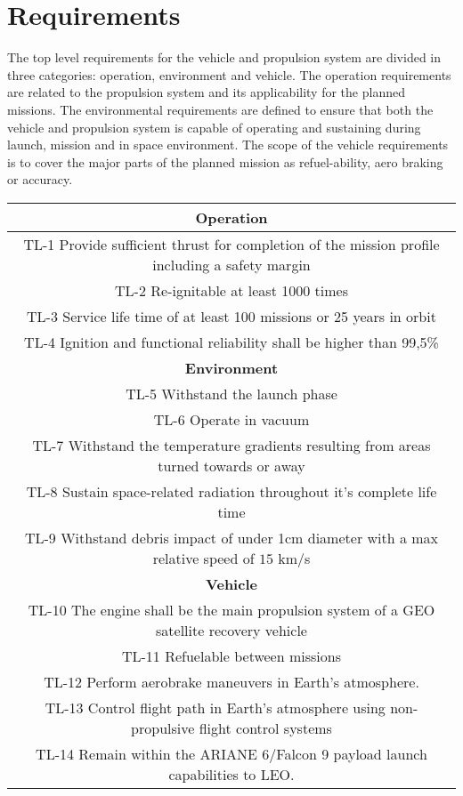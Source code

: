 \chapter{Requirements}
\qquad The top level requirements for the vehicle and propulsion system are divided in three categories: operation, environment and vehicle. The operation requirements are related to the propulsion system and its applicability for the planned missions. The environmental requirements are defined to ensure that both the vehicle and propulsion system is capable of operating and sustaining during launch, mission and in space environment. The scope of the vehicle requirements is to cover the major parts of the planned mission as refuel-ability, aero braking or accuracy. \\
\noindent
\begin{table}
\begin{tabular}{|c|}
	\hline
	\cellcolor{blue!60}\textbf{Operation}\\
	\hline
	\cellcolor{blue!15} TL-1 Provide sufficient thrust for completion of the mission profile including a safety margin\\
	\hline
	\cellcolor{blue!15} TL-2 Re-ignitable at least 1000 times\\
	\hline
	\cellcolor{blue!15} TL-3 Service life time of at least 100 missions or 25 years in orbit\\
	\hline
	\cellcolor{blue!15} TL-4 Ignition and functional reliability shall be higher than 99,5\%\\

	\hline
	\cellcolor{blue!60}\textbf{Environment}\\
	\hline
	\cellcolor{blue!15} TL-5 Withstand the launch phase
	\\
	\hline
	\cellcolor{blue!15} TL-6 Operate in vacuum
	\\
	\hline
	\cellcolor{blue!15} TL-7 Withstand the temperature gradients resulting from areas turned towards or away
	\\
	\hline
	\cellcolor{blue!15} TL-8 Sustain space-related radiation throughout it's complete life time
	
	\\
	\hline
	\cellcolor{blue!15} TL-9 Withstand debris impact of under 1cm diameter with a max relative speed of $15$ km/s 	
	\\
	\hline
	\cellcolor{blue!60}\textbf{Vehicle}\\
	\hline
	\cellcolor{blue!15} TL-10 The engine shall be the main propulsion system of a GEO satellite recovery vehicle
	\\
	\hline
	\cellcolor{blue!15} TL-11 Refuelable between missions
	\\
	\hline
	\cellcolor{blue!15} TL-12 Perform aerobrake maneuvers in Earth's atmosphere.
	\\
	\hline
	\cellcolor{blue!15} TL-13 Control \space flight path in  Earth's atmosphere  using non-propulsive flight control systems
	\\
	\cellcolor{blue!15} TL-14 Remain within the ARIANE 6/Falcon 9 payload launch capabilities to LEO.
	

\end{tabular}
\end{table}
